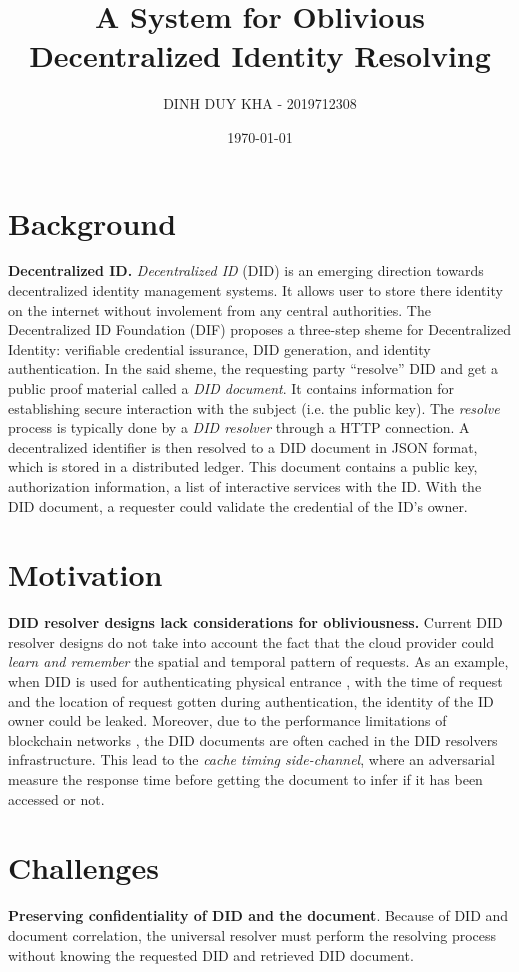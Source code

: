 \documentclass[11pt]{article}
\author{DINH DUY KHA - 2019712308}
\date{\today}
\title{A System for Oblivious Decentralized Identity Resolving}
\begin{document}
\maketitle
\section{Background}
\label{sec:orgcb41276}
\textbf{Decentralized ID.} \emph{Decentralized ID} (DID) is an emerging direction towards decentralized identity management systems. It allows user to store there identity on the internet without involement from any central authorities. The Decentralized ID Foundation \cite{dif} (DIF) proposes a three-step sheme for Decentralized Identity: verifiable credential issurance, DID generation, and identity authentication. In the said sheme, the requesting party ``resolve'' DID and get a public proof material called a \emph{DID document}. It contains information for establishing secure interaction with the subject (i.e. the public key). The \emph{resolve} process is typically done by a \emph{DID resolver} through a HTTP connection. A decentralized identifier is then resolved to a DID document in JSON format, which is stored in a distributed ledger. This document contains a public key, authorization information, a list of interactive services with the ID. With the DID document, a requester could validate the credential of the ID's owner.

\section{Motivation}
\label{sec:orgb2f463b}
\textbf{DID resolver designs lack considerations for obliviousness.} Current DID resolver designs do not take into account the fact that the cloud provider could \emph{learn and remember} the spatial and temporal pattern of requests. As an example, when DID is used for authenticating physical entrance \cite{vaccine-passport}, with the time of request and the location of request gotten during authentication, the identity of the ID owner could be leaked.
Moreover, due to the performance limitations of blockchain networks \cite{blockchain-record}, the DID documents are often cached in the DID resolvers infrastructure. This lead to the \emph{cache timing side-channel}, where an adversarial measure the response time before getting the document to infer if it has been accessed or not.

\section{Challenges}
\label{sec:org09fdfb0}
\textbf{Preserving confidentiality of DID and the document}. Because of DID and document correlation, the universal resolver must perform the resolving process without knowing the requested DID and retrieved DID document.
\end{document}

